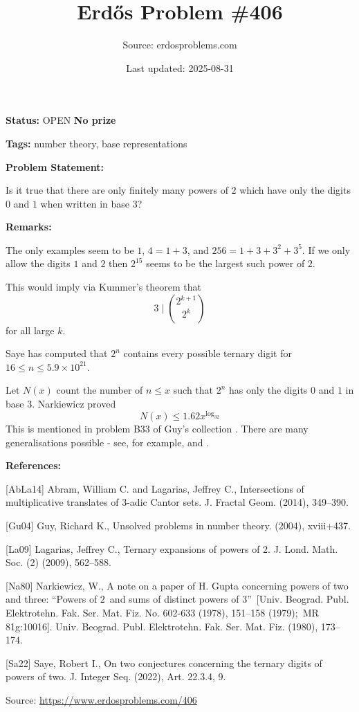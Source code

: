 \documentclass{article}
\title{Erd\H{o}s Problem \#406}
\date{Last updated: 2025-08-31}
\author{Source: erdosproblems.com}
\begin{document}
\maketitle

\noindent\textbf{Status:} OPEN \quad \textbf{No prize}

\noindent\textbf{Tags:} number theory, base representations

\medskip
\noindent\textbf{Problem Statement:}

Is it true that there are only finitely many powers of $2$ which have only the digits $0$ and $1$ when written in base $3$?

\bigskip
\noindent\textbf{Remarks:}

The only examples seem to be $1$, $4=1+3$, and $256=1+3+3^2+3^5$. If we only allow the digits $1$ and $2$ then $2^{15}$ seems to be the largest such power of $2$.

This would imply via Kummer's theorem that\[3\mid \binom{2^{k+1}}{2^k}\]for all large $k$.

Saye \cite{Sa22} has computed that $2^n$ contains every possible ternary digit for $16\leq n \leq 5.9\times 10^{21}$.

Let $N(x)$ count the number of $n\leq x$ such that $2^n$ has only the digits $0$ and $1$ in base $3$. Narkiewicz \cite{Na80} proved\[N(x)\leq 1.62 x^{\log_32}\]This is mentioned in problem B33 of Guy's collection \cite{Gu04}. There are many generalisations possible - see, for example, \cite{AbLa14} and \cite{La09}.

\bigskip
\noindent\textbf{References:}

[AbLa14] Abram, William C. and Lagarias, Jeffrey C., Intersections of multiplicative translates of 3-adic {C}antor
sets. J. Fractal Geom. (2014), 349--390.
 
 [Gu04] Guy, Richard K., Unsolved problems in number theory. (2004), xviii+437.
 
 [La09] Lagarias, Jeffrey C., Ternary expansions of powers of 2. J. Lond. Math. Soc. (2) (2009), 562--588.
 
 [Na80] Narkiewicz, W., A note on a paper of {H}. {G}upta concerning powers of two and
three: ``{P}owers of {$2$}\ and sums of distinct powers of
{$3$}''\ [{U}niv. {B}eograd. {P}ubl. {E}lektrotehn. {F}ak.
Ser. {M}at. {F}iz. {N}o. 602-633 (1978), 151--158 (1979);\
{MR} 81g:10016]. Univ. Beograd. Publ. Elektrotehn. Fak. Ser. Mat. Fiz. (1980), 173--174.
 
 [Sa22] Saye, Robert I., On two conjectures concerning the ternary digits of powers of
two. J. Integer Seq. (2022), Art. 22.3.4, 9.

\bigskip
\noindent\small{Source: \url{https://www.erdosproblems.com/406}}
\end{document}
